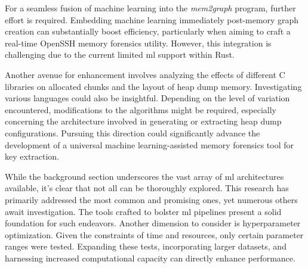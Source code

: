 For a seamless fusion of machine learning into the \textit{mem2graph} program, further effort is required. Embedding machine learning immediately post-memory graph creation can substantially boost efficiency, particularly when aiming to craft a real-time OpenSSH memory forensics utility. However, this integration is challenging due to the current limited \acrshort{ml} support within Rust.

Another avenue for enhancement involves analyzing the effects of different C libraries on allocated chunks and the layout of heap dump memory. Investigating various languages could also be insightful. Depending on the level of variation encountered, modifications to the algorithms might be required, especially concerning the architecture involved in generating or extracting heap dump configurations. Pursuing this direction could significantly advance the development of a universal machine learning-assisted memory forensics tool for key extraction.

While the background section underscores the vast array of \acrshort{ml} architectures available, it's clear that not all can be thoroughly explored. This research has primarily addressed the most common and promising ones, yet numerous others await investigation. The tools crafted to bolster \acrshort{ml} pipelines present a solid foundation for such endeavors. Another dimension to consider is hyperparameter optimization. Given the constraints of time and resources, only certain parameter ranges were tested. Expanding these tests, incorporating larger datasets, and harnessing increased computational capacity can directly enhance performance.


